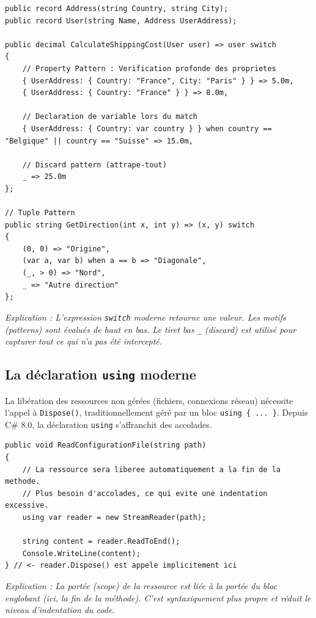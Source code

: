 \begin{lstlisting}[language={[Sharp]C}]
public record Address(string Country, string City);
public record User(string Name, Address UserAddress);

public decimal CalculateShippingCost(User user) => user switch
{
    // Property Pattern : Verification profonde des proprietes
    { UserAddress: { Country: "France", City: "Paris" } } => 5.0m,
    { UserAddress: { Country: "France" } } => 8.0m,
    
    // Declaration de variable lors du match
    { UserAddress: { Country: var country } } when country == "Belgique" || country == "Suisse" => 15.0m,
    
    // Discard pattern (attrape-tout)
    _ => 25.0m
};

// Tuple Pattern
public string GetDirection(int x, int y) => (x, y) switch
{
    (0, 0) => "Origine",
    (var a, var b) when a == b => "Diagonale",
    (_, > 0) => "Nord",
    _ => "Autre direction"
};
\end{lstlisting}
\textit{Explication : L'expression \texttt{switch} moderne retourne une valeur. Les motifs (\textit{patterns}) sont évalués de haut en bas. Le tiret bas \texttt{\_} (discard) est utilisé pour capturer tout ce qui n'a pas été intercepté.}

\subsection{La déclaration \texttt{using} moderne}

La libération des ressources non gérées (fichiers, connexions réseau) nécessite l'appel à \texttt{Dispose()}, traditionnellement géré par un bloc \texttt{using \{ ... \}}. Depuis C\# 8.0, la déclaration \texttt{using} s'affranchit des accolades.

\begin{lstlisting}[language={[Sharp]C}]
public void ReadConfigurationFile(string path)
{
    // La ressource sera liberee automatiquement a la fin de la methode.
    // Plus besoin d'accolades, ce qui evite une indentation excessive.
    using var reader = new StreamReader(path);
    
    string content = reader.ReadToEnd();
    Console.WriteLine(content);
} // <- reader.Dispose() est appele implicitement ici
\end{lstlisting}
\textit{Explication : La portée (scope) de la ressource est liée à la portée du bloc englobant (ici, la fin de la méthode). C'est syntaxiquement plus propre et réduit le niveau d'indentation du code.}

